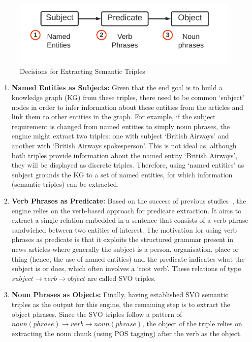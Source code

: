 \begin{figure}[H]
  \centering
  \includegraphics[scale=0.15]{images/relations_kd.png}
  \caption{Decisions for Extracting Semantic Triples}
  \vspace{-1ex}
  \label{fig:rel_key_decisions}
\end{figure}

\begin{enumerate}
  \item \textbf{Named Entities as Subjects:} Given that the end goal is to build a knowledge graph (KG) from these triples, there need to be common `subject' nodes in order to infer information about these entities from the articles and link them to other entities in the graph. For example, if the subject requirement is changed from named entities to simply noun phrases, the engine might extract two triples: one with subject `British Airways' and another with `British Airways spokesperson'. This is not ideal as, although both triples provide information about the named entity `British Airways', they will be displayed as discrete triples. Therefore, using `named entities' as subject grounds the KG to a set of named entities, for which information (semantic triples) can be extracted.
  
  \item \textbf{Verb Phrases as Predicate:} Based on the success of previous studies~\cite{verb_relation_extraction}, the engine relies on the verb-based approach for predicate extraction. It aims to extract a single relation embedded in a sentence that consists of a verb phrase sandwiched between two entities of interest. The motivation for using verb phrases as predicate is that it exploits the structured grammar present in news articles where generally the subject is a person, organisation, place or thing (hence, the use of named entities) and the predicate indicates what the subject is or does, which often involves a `root verb'. These relations of type $subject \rightarrow verb \rightarrow object$ are called SVO triples.
  
  \item \textbf{Noun Phrases as Objects:} Finally, having established SVO semantic triples as the output for this engine, the remaining step is to extract the object phrases. Since the SVO triples follow a pattern of $noun(phrase) \rightarrow verb \rightarrow noun(phrase)$, the object of the triple relies on extracting the noun chunk (using POS tagging) after the verb as the object. 
  
\end{enumerate}

